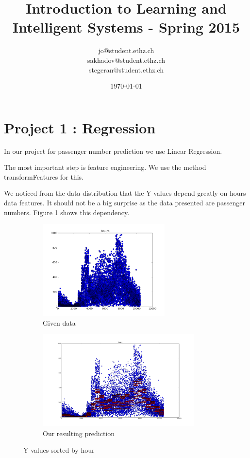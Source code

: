 \documentclass[a4paper, 11pt]{article}
\title{Introduction to Learning and Intelligent Systems - Spring 2015}
\author{jo@student.ethz.ch\\ sakhadov@student.ethz.ch\\  stegeran@student.ethz.ch\\}
\date{\today}
\begin{document}
\maketitle
\section*{Project 1 : Regression}

In our project for passenger number prediction we use Linear Regression.

The most important step is feature engineering. We use the method transformFeatures for this.

We noticed from the data distribution that the Y values depend greatly on hours data features. It should not be a big surprise as the data presented are passenger numbers.
Figure 1 shows this dependency.

\begin{figure}[h]
 
\begin{subfigure}[l]{0.5\textwidth}
\includegraphics[width=0.9\linewidth, height=5cm]{Plots/hours} 
\caption{Given data}
\label{fig:subim1}
\end{subfigure}
\begin{subfigure}[r]{0.5\textwidth}
\includegraphics[width=0.9\linewidth, height=5cm]{Plots/hours_predicted}
\caption{Our resulting prediction}
\label{fig:subim2}
\end{subfigure}
 
\caption{Y values sorted by hour}
\label{fig:image2}
\end{figure}
\end{document}
